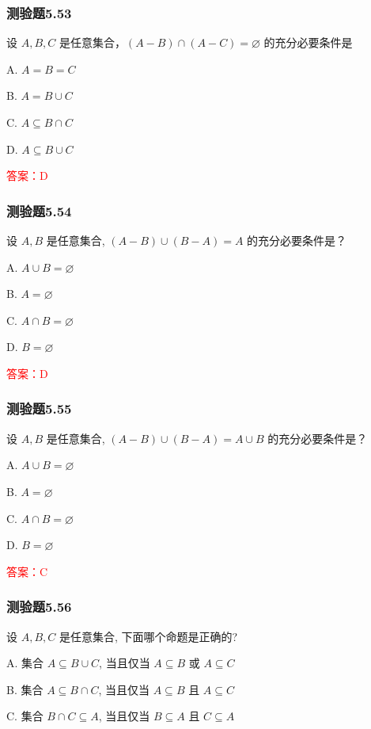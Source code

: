 \documentclass[UTF8, heading=true]{ctexart}
\begin{document}
\subsubsection{测验题5.53}

设 $A, B, C$ 是任意集合，$(A-B) \cap(A-C)=\varnothing$ 的充分必要条件是 $\qquad$


A. $A=B=C $

B. $A=B \cup C $

C. $A \subseteq B \cap C $

D. $A \subseteq B \cup C$

\textcolor{red}{答案：D}



\subsubsection{测验题5.54}

设 $A, B$ 是任意集合, $(A-B) \cup(B-A)=A$ 的充分必要条件是？

A. $A \cup B=\varnothing$

B. $A=\varnothing$

C. $A \cap B=\varnothing$

D. $B=\varnothing$

\textcolor{red}{答案：D}

\subsubsection{测验题5.55}
设 $A, B$ 是任意集合, $(A-B) \cup(B-A)=A \cup B$ 的充分必要条件是？

A. $A \cup B=\varnothing$

B. $A=\varnothing$

C. $A \cap B=\varnothing$

D. $B=\varnothing$

\textcolor{red}{答案：C}

\subsubsection{测验题5.56}

设 $A, B, C$ 是任意集合, 下面哪个命题是正确的?

A. 集合 $A \subseteq B \cup C$, 当且仅当 $A \subseteq B$ 或 $A \subseteq C$

B. 集合 $A \subseteq B \cap C$, 当且仅当 $A \subseteq B$ 且 $A \subseteq C$

C. 集合 $B \cap C \subseteq A$, 当且仅当 $B \subseteq A$ 且 $C \subseteq A$
\end{document}
